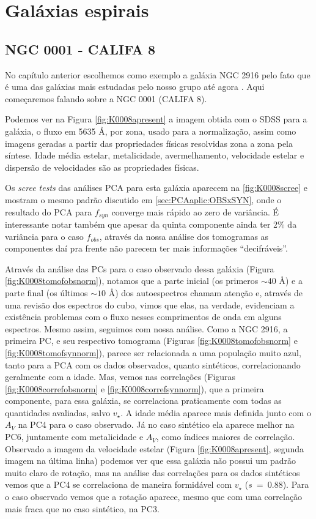 \section{Galáxias espirais}
\label{sec:result:spirals}

\subsection{NGC 0001 - CALIFA 8}

No capítulo anterior escolhemos como exemplo a galáxia NGC 2916 pelo fato que é uma das galáxias mais estudadas pelo
nosso grupo até agora \citep{CidFernandes2013, CidFernandes2014}. Aqui começaremos falando sobre a NGC 0001 (CALIFA 8).

Podemos ver na Figura \ref{fig:K0008apresent} a imagem obtida com o SDSS para a galáxia, o fluxo em 5635 \AA, por zona,
usado para a normalização, assim como imagens geradas a partir das propriedades físicas resolvidas zona a zona pela
síntese. Idade média estelar, metalicidade, avermelhamento, velocidade estelar e dispersão de velocidades são
as propriedades físicas. 

Os {\em scree tests} das análises PCA para esta galáxia aparecem na \ref{fig:K0008scree} e mostram o mesmo padrão
discutido em \ref{sec:PCAaplic:OBSxSYN}, onde o resultado do PCA para $f_{syn}$ converge mais rápido ao zero de
variância. É interessante notar também que apesar da quinta componente ainda ter 2\% da variância para o caso $f_{obs}$,
através da nossa análise dos tomogramas as componentes daí pra frente não parecem ter mais informações ``decifráveis''.

Através da análise das PCs para o caso observado dessa galáxia (Figura \ref{fig:K0008tomofobsnorm}), notamos que a parte
inicial (os primeros $\sim40$ \AA) e a parte final (os últimos $\sim10$ \AA) dos autoespectros chamam atenção e, através
de uma revisão dos espectros do cubo, vimos que elas, na verdade, evidenciam a existência problemas com o fluxo nesses
comprimentos de onda em alguns espectros. Mesmo assim, seguimos com nossa análise. Como a NGC 2916, a primeira PC, e seu
respectivo tomograma (Figuras \ref{fig:K0008tomofobsnorm} e \ref{fig:K0008tomofsynnorm}), parece ser relacionada a uma
população muito azul, tanto para a PCA com os dados observados, quanto sintéticos, correlacionando geralmente com a
idade. Mas, vemos nas correlações (Figuras \ref{fig:K0008correfobsnorm} e \ref{fig:K0008correfsynnorm}), que a primeira
componente, para essa galáxia, se correlaciona praticamente com todas as quantidades avaliadas, salvo $v_\star$. A idade
média aparece mais definida junto com o $A_V$ na PC4 para o caso observado. Já no caso sintético ela aparece melhor na
PC6, juntamente com metalicidade e $A_V$, como índices maiores de correlação. Observado a imagem da velocidade estelar
(Figura \ref{fig:K0008apresent}, segunda imagem na última linha) podemos ver que essa galáxia não possui um padrão muito
claro de rotação, mas na análise das correlações para os dados sintéticos vemos que a PC4 se correlaciona de maneira
formidável com $v_\star$ ($s\ =\ 0.88$). Para o caso observado vemos que a rotação aparece, mesmo que com uma correlação
mais fraca que no caso sintético, na PC3.

